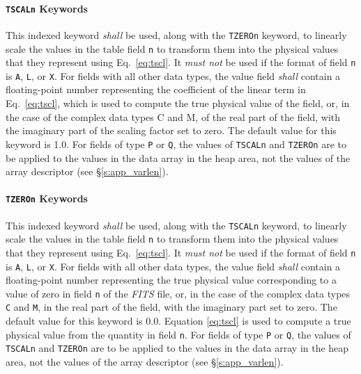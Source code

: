 \documentclass[11pt,makeidx]{book}     %
\begin{document}
   \paragraph{{\tt TSCALn} Keywords}
 This indexed keyword {\em shall} be used, along with the {\tt TZEROn}
 keyword, to linearly scale the values in the table field {\tt n}
 to transform them into the physical values that they
 represent using Eq.\ \ref{eq:tscl}.
 It {\em must not} be used  if the format of field 
 {\tt n} is {\tt A}, {\tt L}, or {\tt X}. 
 For fields with all other data types, the
 value field {\em shall} contain a floating-point number representing the
 coefficient of the linear term in Eq.\ \ref{eq:tscl}, which is used   
 to compute the true physical value of the field, or,
 in the case of the complex  data types C and M, of the real part of the
 field, with the imaginary part of the scaling factor set to zero.  The 
 default value for this keyword is 1.0. 
  For fields  of type {\tt P} or {\tt Q},
the values of {\tt TSCALn} and {\tt TZEROn}
are to be applied to the values in the
data array in the heap  area, not the values of the array descriptor
(see \S\ref{s:app_varlen}).

    \paragraph{{\tt TZEROn} Keywords}
 This indexed keyword {\em shall} be used, along with the {\tt TSCALn}
 keyword, to linearly scale the values in the table field {\tt n}
 to transform them
 into the physical  values that they
 represent using Eq.\ \ref{eq:tscl}. It {\em must not} be used 
 if the format of field 
 {\tt n} is {\tt A}, {\tt L}, or {\tt X}.  
 For fields with all other data types, 
 the value field {\em shall} contain a floating-point number
 representing the true physical value corresponding to a value of 
 zero in field {\tt n} of the {\em FITS\/} file, or, in the case of the complex 
 data types {\tt C} and {\tt M}, in the real part of the field, 
 with the imaginary part set
 to zero.  The default value for this keyword is 0.0.
 Equation \ref{eq:tscl} is used to compute a true
 physical value from the quantity in field {\tt n}.
  For fields  of type {\tt P} or {\tt Q},
the values of {\tt TSCALn} and {\tt TZEROn}
are to be applied to the values in the
data array in the heap  area, not the values of the array descriptor
(see \S\ref{s:app_varlen}).
\end{document}
